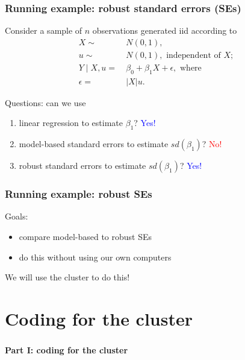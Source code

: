 \documentclass[12pt, 
hyperref={colorlinks=true, linkcolor=BlueViolet, urlcolor=BlueViolet},dvipsnames]{beamer}
\begin{document}
\begin{frame}
\frametitle{Running example: robust standard errors (SEs)}

Consider a sample of $n$ observations generated iid according to
\begin{align*}
X \sim & \ N(0, 1), \\
u \sim & \ N(0, 1), \text{ independent of $X$}; \\
Y \mid X, u =& \ \beta_0 + \beta_1 X + \epsilon, \text{ where } \\
\epsilon =& \ \lvert X \rvert u.
\end{align*}

Questions: can we use \vspace{-0.3cm}
\begin{enumerate}
\item linear regression to estimate $\beta_1$? \pause \textcolor{blue}{Yes!} \pause
\item model-based standard errors to estimate $sd(\beta_1)$? \pause \textcolor{red}{No!} \pause
\item robust standard errors to estimate $sd(\beta_1)$? \pause \textcolor{blue}{Yes!}
\end{enumerate}
\end{frame}

\begin{frame}
\frametitle{Running example: robust SEs}
Goals: \vspace{-0.3cm}  \pause
\begin{itemize}
\item compare model-based to robust SEs \pause
\item do this without using our own computers \pause
\end{itemize}

We will use the cluster to do this!
\end{frame}

\section{Coding for the cluster}
\begin{frame}
\frametitle{}
\begin{center}
{\large \textbf{Part I: coding for the cluster}}
\end{center}
\end{frame}
\end{document}
